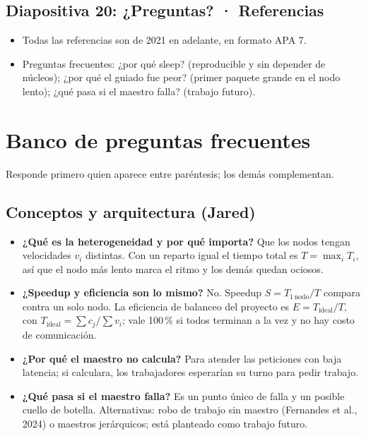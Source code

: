 \documentclass[11pt,a4paper]{article}
\begin{document}
\subsection*{Diapositiva 20: ¿Preguntas? · Referencias}
\begin{itemize}
  \item Todas las referencias son de 2021 en adelante, en formato APA 7.
  \item Preguntas frecuentes: ¿por qué sleep? (reproducible y sin depender de núcleos); ¿por qué el guiado fue peor? (primer paquete grande en el nodo lento); ¿qué pasa si el maestro falla? (trabajo futuro).
\end{itemize}

\newpage
\section*{Banco de preguntas frecuentes}
Responde primero quien aparece entre paréntesis; los demás complementan.

\subsection*{Conceptos y arquitectura (Jared)}
\begin{itemize}
  \item \textbf{¿Qué es la heterogeneidad y por qué importa?} Que los nodos tengan velocidades $v_i$ distintas. Con un reparto igual el tiempo total es $T=\max_i T_i$, así que el nodo más lento marca el ritmo y los demás quedan ociosos.
  \item \textbf{¿Speedup y eficiencia son lo mismo?} No. Speedup $S=T_{1\,\text{nodo}}/T$ compara contra un solo nodo. La eficiencia de balanceo del proyecto es $E=T_{\text{ideal}}/T$, con $T_{\text{ideal}}=\sum c_j/\sum v_i$; vale 100\,\% si todos terminan a la vez y no hay costo de comunicación.
  \item \textbf{¿Por qué el maestro no calcula?} Para atender las peticiones con baja latencia; si calculara, los trabajadores esperarían su turno para pedir trabajo.
  \item \textbf{¿Qué pasa si el maestro falla?} Es un punto único de falla y un posible cuello de botella. Alternativas: robo de trabajo sin maestro (Fernandes et al., 2024) o maestros jerárquicos; está planteado como trabajo futuro.
\end{itemize}
\end{document}
